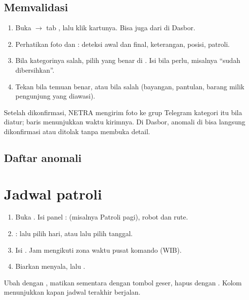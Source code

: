 \documentclass[11pt]{article}
\newcommand{\ra}{\ensuremath{\rightarrow}}
\begin{document}
\subsection{Memvalidasi}
\begin{enumerate}
  \item Buka  \ra{} tab , lalu klik kartunya. Bisa juga dari
         di Dasbor.
  \item Perhatikan foto dan : deteksi awal dan final, keterangan, posisi, patroli.
  \item Bila kategorinya salah, pilih yang benar di . Isi 
        bila perlu, misalnya ``sudah dibersihkan''.
  \item Tekan  bila temuan benar, atau  bila salah (bayangan, pantulan,
        barang milik pengunjung yang diawasi).
\end{enumerate}
Setelah dikonfirmasi, NETRA mengirim foto ke grup Telegram kategori itu bila diatur; baris
 menunjukkan waktu kirimnya. Di Dasbor, anomali di  bisa langsung
dikonfirmasi atau ditolak tanpa membuka detail.

\subsection{Daftar anomali}

\clearpage
\section{Jadwal patroli}
\begin{enumerate}
  \item Buka . Isi panel :  (misalnya Patroli pagi), robot dan rute.
  \item {}:  lalu pilih hari, atau  lalu pilih tanggal.
  \item Isi . Jam mengikuti zona waktu pusat komando (WIB).
  \item Biarkan  menyala, lalu .
\end{enumerate}
Ubah dengan , matikan sementara dengan tombol geser, hapus dengan . Kolom
 menunjukkan kapan jadwal terakhir berjalan.
\end{document}
